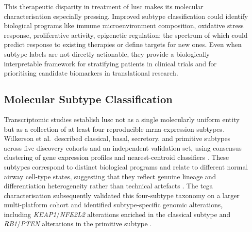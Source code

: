 This therapeutic disparity in treatment of \gls{lusc} makes its molecular characterisation especially pressing. Improved subtype classification could identify biological programs like immune microenvironment composition, oxidative stress response, proliferative activity, epigenetic regulation; the spectrum of which could predict response to existing therapies or define targets for new ones. Even when subtype labels are not directly actionable, they provide a biologically interpretable framework for stratifying patients in clinical trials and for prioritising candidate biomarkers in translational research.

\subsection{Molecular Subtype Classification}

Transcriptomic studies establish \gls{lusc} not as a single molecularly uniform entity but as a collection of at least four reproducible \gls{mrna} expression subtypes. Wilkerson et al.\ described classical, basal, secretory, and primitive subtypes across five discovery cohorts and an independent validation set, using consensus clustering of gene expression profiles and nearest-centroid classifiers \parencite{Wilkerson2010}. These subtypes correspond to distinct biological programs and relate to different normal airway cell-type states, suggesting that they reflect genuine lineage and differentiation heterogeneity rather than technical artefacts \parencite{Wilkerson2010}. The \gls{tcga} characterisation subsequently validated this four-subtype taxonomy on a larger multi-platform cohort and identified subtype-specific genomic alterations, including \textit{KEAP1}/\textit{NFE2L2} alterations enriched in the classical subtype and \textit{RB1}/\textit{PTEN} alterations in the primitive subtype \parencite{Hammerman2012}.

